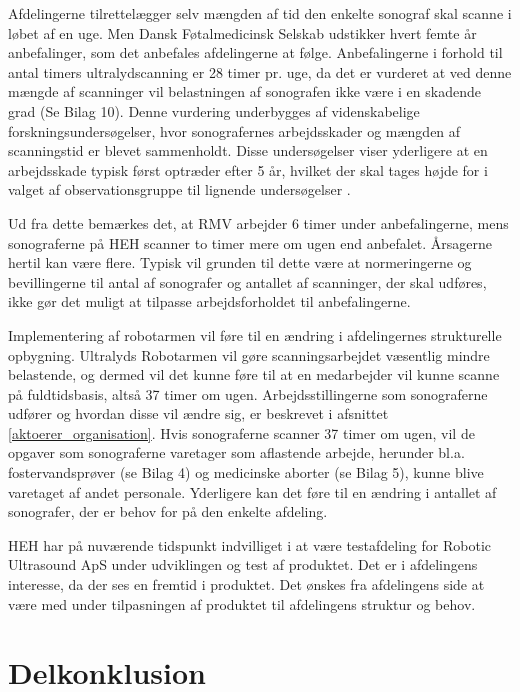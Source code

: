 Afdelingerne tilrettelægger selv mængden af tid den enkelte sonograf skal scanne i løbet af en uge. Men Dansk Føtalmedicinsk Selskab udstikker hvert femte år anbefalinger, som det anbefales afdelingerne at følge. Anbefalingerne i forhold til antal timers ultralydscanning er 28 timer pr. uge, da det er vurderet at ved denne mængde af scanninger vil belastningen af sonografen ikke være i en skadende grad (Se Bilag 10). Denne vurdering underbygges af videnskabelige forskningsundersøgelser, hvor sonografernes arbejdsskader og mængden af scanningstid er blevet sammenholdt. Disse undersøgelser viser yderligere at en arbejdsskade typisk først optræder efter 5 år, hvilket der skal tages højde for i valget af observationsgruppe til lignende undersøgelser \cite{35}.

Ud fra dette bemærkes det, at RMV arbejder 6 timer under anbefalingerne, mens sonograferne på HEH scanner to timer mere om ugen end anbefalet. Årsagerne hertil kan være flere. Typisk vil grunden til dette være at normeringerne og bevillingerne til antal af sonografer og antallet af scanninger, der skal udføres, ikke gør det muligt at tilpasse arbejdsforholdet til anbefalingerne. 

Implementering af robotarmen vil føre til en ændring i afdelingernes strukturelle opbygning. Ultralyds Robotarmen vil gøre scanningsarbejdet væsentlig mindre belastende, og dermed vil det kunne føre til at en medarbejder vil kunne scanne på fuldtidsbasis, altså 37 timer om ugen. Arbejdsstillingerne som sonograferne udfører og hvordan disse vil ændre sig, er beskrevet i afsnittet \ref{aktoerer_organisation}. Hvis sonograferne scanner 37 timer om ugen, vil de opgaver som sonograferne varetager som aflastende arbejde, herunder bl.a. fostervandsprøver (se Bilag 4) og medicinske aborter (se Bilag 5), kunne blive varetaget af andet personale. Yderligere kan det føre til en ændring i antallet af sonografer, der er behov for på den enkelte afdeling. 

HEH har på nuværende tidspunkt indvilliget i at være testafdeling for Robotic Ultrasound ApS under udviklingen og test af produktet. Det er i afdelingens interesse, da der ses en fremtid i produktet. Det ønskes fra afdelingens side at være med under tilpasningen af produktet til afdelingens struktur og behov. 

\section{Delkonklusion}


